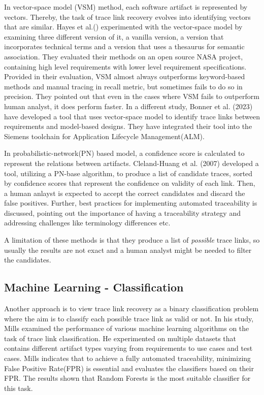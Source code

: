 In vector-space model (VSM) method, each software artifact is represented by vectors. Thereby, the task of trace link recovery evolves into identifying vectors that are similar. Hayes et al.()\cite{hayes-2003} experimented with the vector-space model by examining three different version of it, a vanilla version, a version that incorporates technical terms and a version that uses a thesaurus for semantic association. They evaluated their methods on an open source NASA project, containing high level requirements with lower level requirement specifications. Provided in their evaluation, VSM almost always outperforms keyword-based methods and manual tracing in recall metric, but sometimes fails to do so in precision. They pointed out that even in the cases where VSM fails to outperform human analyst, it does perform faster. In a different study, Bonner et al. (2023)\cite{bonner-2023} have developed a tool that uses vector-space model to identify trace links between requirements and model-based designs. They have integrated their tool into the Siemens toolchain for Application Lifecycle Management(ALM).


In probabilistic-network(PN) based model, a confidence score is calculated to represent the relations between artifacts. Cleland-Huang et al. (2007)\cite{cleland-huang-2007} developed a tool, utilizing a PN-base algorithm, to produce a list of candidate traces, sorted by confidence scores that represent the confidence on validity of each link. Then, a human anlayst is expected to accept the correct candidates and discard the false positives. Further, best practices for implementing automated traceability is discussed, pointing out the importance of having a traceability strategy and addressing challenges like terminology differences etc.

A limitation of these methods is that they produce a list of \textit{possible} trace links, so usually the results are not exact and a human analyst might be needed to filter the candidates.

\subsection{Machine Learning - Classification}

Another approach is to view trace link recovery as a binary classification problem where the aim is to classify each possible trace link as valid or not. In his study, Mills examined the performance of various machine learning algorithms on the task of trace link classification. He experimented on multiple datasets that contains different artifact types varying from requirements to use cases and test cases. Mills indicates that to achieve a fully automated traceability, minimizing False Positive Rate(FPR) is essential and evaluates the classifiers based on their FPR. The results shown that Random Forests is the most suitable classifier for this task.

